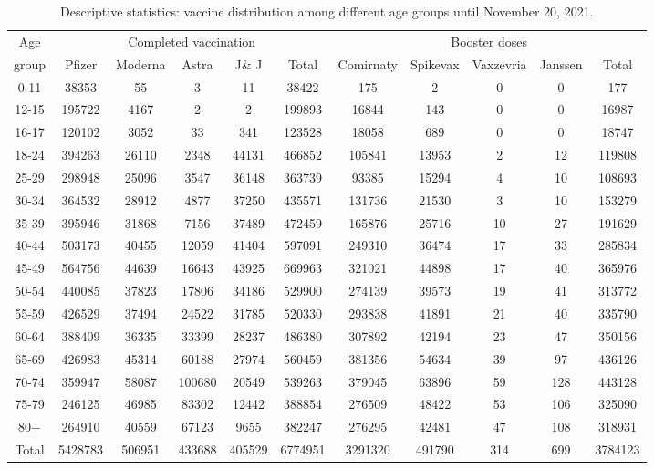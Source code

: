 \documentclass[9pt,onecolumn,twoside,lineno]{article}
\begin{document}
\begin{sidewaystable}[h]
\centering
\caption{Descriptive statistics: vaccine distribution among different age groups until November 20, 2021.  \vspace{2mm}}
\label{description2}
\begin{tabular}{c|ccccc|ccccc}
\hline
Age & \multicolumn{5}{c|}{Completed vaccination} & 
\multicolumn{5}{c}{Booster doses} \\
group & Pfizer & Moderna & Astra & J\& J & Total
& Comirnaty & Spikevax & Vaxzevria & Janssen & Total \\ \hline
0-11&38353&55&3&11&38422&175&2&0&0&177\\
12-15&195722&4167&2&2&199893&16844&143&0&0&16987\\
16-17&120102&3052&33&341&123528&18058&689&0&0&18747\\
18-24&394263&26110&2348&44131&466852&105841&13953&2&12&119808\\
25-29&298948&25096&3547&36148&363739&93385&15294&4&10&108693\\
30-34&364532&28912&4877&37250&435571&131736&21530&3&10&153279\\
35-39&395946&31868&7156&37489&472459&165876&25716&10&27&191629\\
40-44&503173&40455&12059&41404&597091&249310&36474&17&33&285834\\
45-49&564756&44639&16643&43925&669963&321021&44898&17&40&365976\\
50-54&440085&37823&17806&34186&529900&274139&39573&19&41&313772\\
55-59&426529&37494&24522&31785&520330&293838&41891&21&40&335790\\
60-64&388409&36335&33399&28237&486380&307892&42194&23&47&350156\\
65-69&426983&45314&60188&27974&560459&381356&54634&39&97&436126\\
70-74&359947&58087&100680&20549&539263&379045&63896&59&128&443128\\
75-79&246125&46985&83302&12442&388854&276509&48422&53&106&325090\\
80+&264910&40559&67123&9655&382247&276295&42481&47&108&318931\\
\hline
Total&5428783&506951&433688&405529&6774951&3291320&491790&314&699&3784123\\
\hline
\end{tabular}
\end{sidewaystable}
\end{document}
